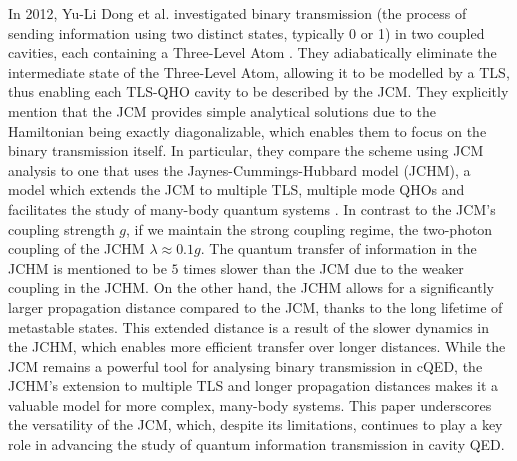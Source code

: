 \documentclass[12pt,a4paper]{article}
\begin{document}
In 2012, Yu-Li Dong et al. investigated binary transmission (the process of sending information using two distinct states, typically 0 or 1) in two coupled cavities, each containing a Three-Level Atom \cite{Context2012-CQED_JCM}. They adiabatically eliminate the intermediate state of the Three-Level Atom, allowing it to be modelled by a TLS, thus enabling each TLS-QHO cavity to be described by the JCM. They explicitly mention that the JCM provides simple analytical solutions due to the Hamiltonian being exactly diagonalizable, which enables them to focus on the binary transmission itself. In particular, they compare the scheme using JCM analysis to one that uses the Jaynes-Cummings-Hubbard model (JCHM), a model which extends the JCM to multiple TLS, multiple mode QHOs and facilitates the study of many-body quantum systems \cite{Context2007-JCH_1,Context2006-JCH_2,Context2006-JCH_3}. In contrast to the JCM's coupling strength $g$, if we maintain the strong coupling regime, the two-photon coupling of the JCHM $\lambda\approx0.1g$. The quantum transfer of information in the JCHM is mentioned to be $5$ times slower than the JCM due to the weaker coupling in the JCHM. On the other hand, the JCHM allows for a significantly larger propagation distance compared to the JCM, thanks to the long lifetime of metastable states. This extended distance is a result of the slower dynamics in the JCHM, which enables more efficient transfer over longer distances. While the JCM remains a powerful tool for analysing binary transmission in cQED, the JCHM's extension to multiple TLS and longer propagation distances makes it a valuable model for more complex, many-body systems. This paper underscores the versatility of the JCM, which, despite its limitations, continues to play a key role in advancing the study of quantum information transmission in cavity QED.\\
\\
\end{document}
